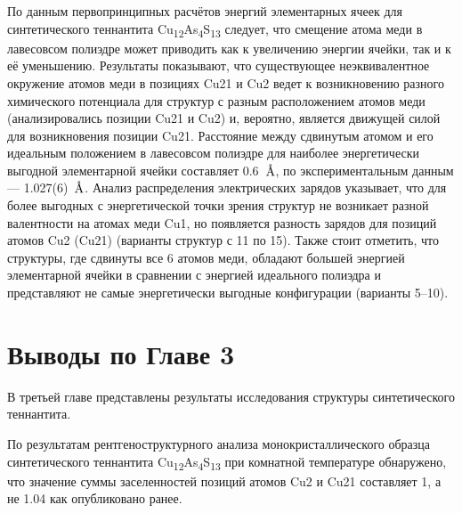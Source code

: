 По данным первопринципных расчётов энергий элементарных ячеек для синтетического теннантита Cu\textsubscript{12}As\textsubscript{4}S\textsubscript{13} следует,  что смещение атома меди в лавесовсом полиэдре может приводить как к увеличению энергии ячейки, так и к её уменьшению.
Результаты показывают, что существующее неэквивалентное  окружение атомов меди в позициях Cu21 и Cu2 ведет к возникновению разного химического потенциала для структур с разным расположением атомов меди (анализировались позиции Cu21 и Cu2) и, вероятно, является движущей силой для возникновения позиции Cu21. Расстояние между сдвинутым атомом и его идеальным положением в лавесовсом полиэдре для наиболее энергетически выгодной элементарной ячейки составляет 0.6~$\mbox{\normalfont\AA}$, по экспериментальным данным --- 1.027(6)~$\mbox{\normalfont\AA}$.
Анализ распределения электрических зарядов указывает, что для более выгодных с энергетической точки зрения структур не возникает разной валентности на атомах меди Cu1,
но появляется разность зарядов для позиций атомов Cu2 (Cu21) (варианты структур с 11 по 15). Также стоит отметить, что структуры, где сдвинуты все 6 атомов меди, обладают большей энергией элементарной ячейки в сравнении с энергией идеального полиэдра и представляют не самые энергетически выгодные конфигурации  (варианты 5--10).










\clearpage

\newpage


\section{Выводы по Главе 3} \label{sect3_6}

В третьей главе представлены результаты исследования структуры синтетического теннантита.



По результатам рентгеноструктурного анализа монокристаллического образца синтетического теннантита Cu\textsubscript{12}As\textsubscript{4}S\textsubscript{13} при комнатной температуре обнаружено, что значение суммы заселенностей позиций атомов Cu2 и Cu21 составляет 1, а не 1.04 как опубликовано ранее\cite{Makovicky_2006}.


